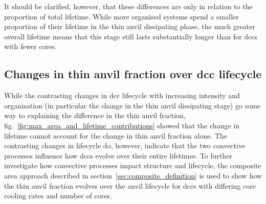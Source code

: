 It should be clarified, however, that these differences are only in relation to the proportion of total lifetime.
While more organised systems spend a smaller proportion of their lifetime in the thin anvil dissipating phase, the much greater overall lifetime means that this stage still lasts substantially longer than for \acrfull{dcc}s with fewer cores.





\subsection{Changes in thin anvil fraction over \acrshort{dcc} lifecycle} \label{sec:composite_results}

While the contrasting changes in \acrshort{dcc} lifecycle with increasing intensity and organisation (in particular the change in the thin anvil dissipating stage) go some way to explaining the difference in the thin anvil fraction, fig.~\ref{fig:max_area_and_lifetime_contributions} showed that the change in lifetime cannot account for the change in thin anvil fraction alone.
The contrasting changes in lifecycle do, however, indicate that the two convective processes influence how \acrshort{dcc}s evolve over their entire lifetimes.
To further investigate how convective processes impact structure and lifecycle, the composite area approach described in section~\ref{sec:composite_definition} is used to show how the thin anvil fraction evolves over the anvil lifecycle for \acrshort{dcc}s with differing core cooling rates and number of cores.


